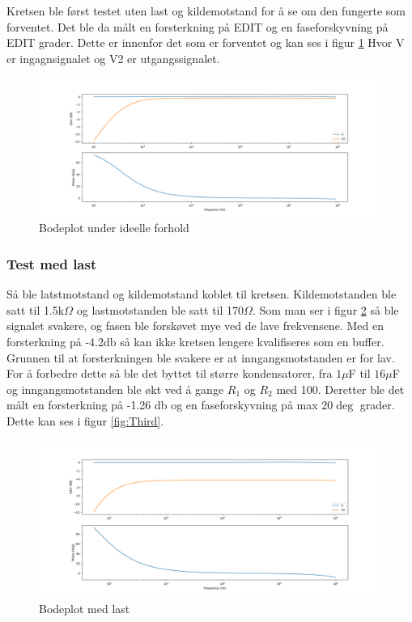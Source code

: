 Kretsen ble først testet uten last og kildemotstand for å se om den fungerte som forventet. Det ble da målt en forsterkning på EDIT og en faseforskyvning på EDIT grader. Dette er innenfor det som er forventet og kan ses i figur \ref{fig:Bodeplot+Pase_First} Hvor V er ingagnsignalet og V2 er utgangssignalet.

\begin{figure}[H]
\centering
\includegraphics[scale=0.4]{bilder/Bodeplot+Pase_First.png}
\caption{Bodeplot under ideelle forhold}
\label{fig:Bodeplot+Pase_First}
\end{figure}


\subsubsection{Test med last}

Så ble latstmotstand og kildemotstand koblet til kretsen. Kildemotstanden ble satt til 1.5k$\Omega$ og lastmotstanden ble satt til 170$\Omega$. Som man ser i figur \ref{fig:Bodeplot+Pase_Second} så ble signalet svakere, og fasen ble forskøvet mye ved de lave frekvensene. Med en forsterkning på -4.2db så kan ikke kretsen lengere kvalifiseres som en buffer. Grunnen til at forsterkningen ble svakere er at inngangsmotstanden er for lav. For å forbedre dette så ble det byttet til større kondensatorer, fra $1\mu$F til $16\mu$F og inngangsmotstanden ble økt ved å gange $R_1$ og $R_2$ med 100. Deretter ble det målt en forsterkning på -1.26 db og en faseforskyvning på max $20\deg$ grader. Dette kan ses i figur \ref{fig:Third}.

\begin{figure}[H]
\centering
\includegraphics[scale=0.4]{bilder/Bodeplot+Pase_Second.png}
\caption{Bodeplot med last}
\label{fig:Bodeplot+Pase_Second}
\end{figure}

